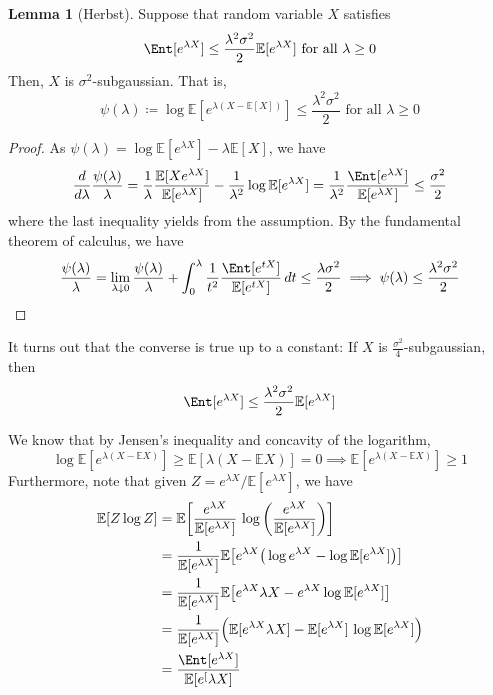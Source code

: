 \documentclass{article}
\theoremstyle{definition}
\newtheorem{lemma}[theorem]{Lemma}
\theoremstyle{remark}
\theoremstyle{definition}
\begin{document}
  \begin{lemma}[Herbst]
  Suppose that random variable $X$ satisfies
  \[\Ent[e^{\lambda X}] \leq \frac{\lambda^2 \sigma^2}{2} \mathbb{E}[e^{\lambda X}]  \text{ for all } \lambda \geq 0\]
  Then, $X$ is $\sigma^2$-subgaussian. That is, 
  \[\psi(\lambda) \coloneqq \log\mathbb{E}[e^{\lambda (X - \mathbb{E}[X])}] \leq \frac{\lambda^2 \sigma^2}{2} \text{ for all } \lambda \geq 0\]
  \end{lemma}
  \begin{proof}
  As $\psi(\lambda) = \log\mathbb{E}[ e^{\lambda X}] - \lambda \mathbb{E}[X]$, we have 
  \[\frac{d}{d \lambda} \frac{\psi(\lambda)}{\lambda} = \frac{1}{\lambda} \frac{\mathbb{E}[X e^{\lambda X}]}{\mathbb{E}[e^{\lambda X}]} - \frac{1}{\lambda^2} \log \mathbb{E}[e^{\lambda X}] = \frac{1}{\lambda^2} \frac{\Ent [e^{\lambda X}]}{\mathbb{E}[e^{\lambda X}]} \leq \frac{\sigma^2}{2}\]
  where the last inequality yields from the assumption. By the fundamental theorem of calculus, we have 
  \[\frac{\psi (\lambda)}{\lambda} = \lim_{\lambda \downarrow 0} \frac{\psi(\lambda)}{\lambda} + \int_0^\lambda \frac{1}{t^2} \frac{\Ent[e^{t X}]}{\mathbb{E}[e^{t X}]} \,dt \leq \frac{\lambda \sigma^2}{2} \implies \psi(\lambda) \leq \frac{\lambda^2 \sigma^2}{2}\]
  \end{proof}

  \begin{exercise}
  It turns out that the converse is true up to a constant: If $X$ is $\frac{\sigma^2}{4}$-subgaussian, then 
  \[\Ent [e^{\lambda X}] \leq \frac{\lambda^2 \sigma^2}{2} \mathbb{E}[e^{\lambda X}]\]
  \end{exercise}
  \begin{solution}
  We know that by Jensen's inequality and concavity of the logarithm, 
  \[\log \mathbb{E}[e^{\lambda(X - \mathbb{E} X)}] \geq \mathbb{E}[\lambda (X - \mathbb{E} X)] = 0 \implies \mathbb{E}[e^{\lambda(X - \mathbb{E} X)}] \geq 1\]
  Furthermore, note that given $Z = e^{\lambda X} / \mathbb{E}[e^{\lambda X}]$, we have 
  \begin{align*}
      \mathbb{E}[Z \log{Z}] & = \mathbb{E} \bigg[ \frac{e^{\lambda X}}{\mathbb{E}[e^{\lambda X}]} \, \log \bigg( \frac{e^{\lambda X}}{\mathbb{E}[e^{\lambda X}]} \bigg) \bigg] \\
      & = \frac{1}{\mathbb{E}[e^{\lambda X}]} \mathbb{E}\big[ e^{\lambda X} \big( \log e^{\lambda X} - \log \mathbb{E}[e^{\lambda X}] \big) \big] \\
      & = \frac{1}{\mathbb{E}[e^{\lambda X}]} \mathbb{E} \big[ e^{\lambda X} \lambda X - e^{\lambda X} \log \mathbb{E}[e^{\lambda X}] \big] \\
      & = \frac{1}{\mathbb{E}[e^{\lambda X}]} \Big( \mathbb{E} [ e^{\lambda X} \lambda X ] - \mathbb{E}[ e^{\lambda X}] \, \log \mathbb{E}[e^{\lambda X}] \Big) \\
      & = \frac{\Ent [e^{\lambda X}]}{\mathbb{E}[e^[{\lambda X}]} 
  \end{align*}

  \end{solution}
\end{document}
